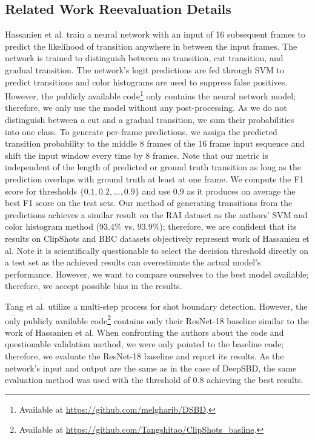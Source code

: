 \subsection{Related Work Reevaluation Details}\label{sec:transnetv2Reevaluation}
Hassanien et al. train a neural network with an input of 16 subsequent frames to predict the likelihood of transition anywhere in between the input frames. The network is trained to distinguish between no transition, cut transition, and gradual transition. The network's logit predictions are fed through SVM to predict transitions and color histograms are used to suppress false positives. However, the publicly available code\footnote{Available at \url{https://github.com/melgharib/DSBD}.} only contains the neural network model; therefore, we only use the model without any post-processing. As we do not distinguish between a cut and a gradual transition, we sum their probabilities into one class. To generate per-frame predictions, we assign the predicted transition probability to the middle 8 frames of the 16 frame input sequence and shift the input window every time by 8 frames. Note that our metric is independent of the length of predicted or ground truth transition as long as the prediction overlaps with ground truth at least at one frame. We compute the F1 score for thresholds $\{0.1, 0.2, \dots, 0.9\}$ and use $0.9$ as it produces on average the best F1 score on the test sets. Our method of generating transitions from the predictions achieves a similar result on the RAI dataset as the authors' SVM and color histogram method (93.4\% vs. 93.9\%); therefore, we are confident that its results on ClipShots and BBC datasets objectively represent work of Hassanien et al. Note it is scientifically questionable to select the decision threshold directly on a test set as the achieved results can overestimate the actual model's performance. However, we want to compare ourselves to the best model available; therefore, we accept possible bias in the results. 

Tang et al. utilize a multi-step process for shot boundary detection. However, the only publicly available code\footnote{Available at \url{https://github.com/Tangshitao/ClipShots_basline}.} contains only their ResNet-18 baseline similar to the work of Hassanien et al. When confronting the authors about the code and questionable validation method, we were only pointed to the baseline code; therefore, we evaluate the ResNet-18 baseline and report its results. As the network's input and output are the same as in the case of DeepSBD, the same evaluation method was used with the threshold of $0.8$ achieving the best results.


